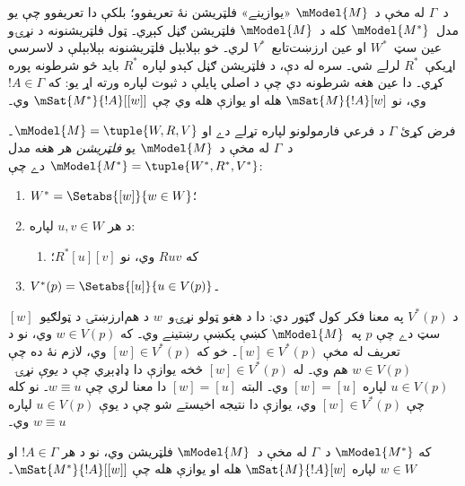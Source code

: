 \documentclass[../../../include/open-logic-section]{subfiles}
\begin{document}


د~$\Gamma$ له مخې د~$\mModel{M}$ «يوازينے» فلټريشن نۀ تعريفوو؛
بلکې دا تعريفوو چې يو مدل~$\mModel{M^*}$ کله د~$\mModel{M}$
فلټريشن ګڼل کېږي۔ ټول فلټريشنونه د نړۍو عين سټ~$W^*$ او عين
ارزښت‌تابع~$V^*$ لري۔ خو بېلابېل فلټريشنونه بېلابېلې د لاسرسي
اړيکې~$R^*$ لرلے شي۔ سره له دې، د فلټريشن ګڼل کېدو لپاره $R^*$
بايد څو شرطونه پوره کړي۔ دا عين هغه شرطونه دي چې د اصلي پايلې د
ثبوت لپاره ورته اړ يو: که $!A \in \Gamma$ وي، نو
$\mSat{M}{!A}[w]$ هله او يوازې هله وي چې
$\mSat{M^*}{!A}[{[w]}]$ وي۔

\begin{defn}
  فرض کړئ $\Gamma$ د فرعي فارمولونو لپاره تړلے دے او
  $\mModel{M} = \tuple{W,
    R, V}$۔ د~$\Gamma$ له مخې د~$\mModel{M}$ يو
  \emph{فلټريشن} هر هغه مدل
  $\mModel{M^*} = \tuple{W^*,R^*,V^*}$ دے چې:
  \begin{enumerate}
  \item $W^* = \Setabs{[w]}{w \in W}$؛
  \item {}%
    د هر $u,v \in W$ لپاره:
    \begin{enumerate}
    \item {}%
      که $Ruv$ وي، نو $R^*[u][v]$؛
    \end{enumerate}
  \item $V^*(p) = \Setabs{[u]}{u \in V(p)}$۔
  \end{enumerate}
\end{defn}

د $V^*(p)$ په معنا فکر کول ګټور دي: دا د هغو ټولو نړۍو~$w$ د
هم‌ارزښتۍ د ټولګيو~$[w]$ سټ دے چې $p$ په~$\mModel{M}$ کښې
پکښې رښتينے وي۔ که $w \in V(p)$ وي، نو د تعريف له مخې
$[w] \in V^*(p)$۔ خو که $[w] \in V^*(p)$ وي، لازم نۀ ده چې
$w \in V(p)$ هم وي۔ له $[w] \in V^*(p)$ څخه يوازې دا ډاډېږي چې
د \emph{يوې} نړۍ~$u \in V(p)$ لپاره $[w] = [u]$ وي۔ البته
$[w] = [u]$ دا معنا لري چې $w \equiv u$۔ نو کله چې
$[w] \in V^*(p)$ وي، يوازې دا نتيجه اخيستے شو چې د يوې
$u \in V(p)$ لپاره $w \equiv u$ وي۔

\begin{thm}
  که $\mModel{M^*}$ د~$\Gamma$ له مخې د~$\mModel{M}$ فلټريشن
  وي، نو د هر $!A \in \Gamma$ او $w \in W$ لپاره
  $\mSat{M}{!A}[w]$ هله او يوازې هله چې
  $\mSat{M^*}{!A}[{[w]}]$۔
\end{thm}
\end{document}
